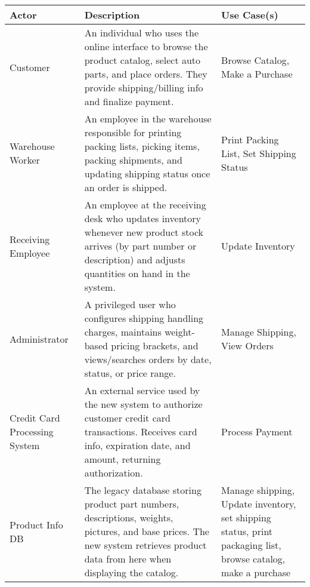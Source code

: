 \documentclass{report}
\begin{document}
    \pagebreak 
    \bigbreak \noindent 
    \begin{center}
        \begin{tabular}{|p{2cm}|p{7cm}|p{5.2cm}|}
            \hline
            Actor	&Description	&Use Case(s) \\
            \hline
            Customer&	An individual who uses the online interface to browse the product catalog, select auto parts, and place orders. They provide shipping/billing info and finalize payment.	&Browse Catalog, Make a Purchase \\
            \hline
            Warehouse Worker	&An employee in the warehouse responsible for printing packing lists, picking items, packing shipments, and updating shipping status once an order is shipped.	&Print Packing List, Set Shipping Status \\
            \hline
            Receiving Employee	&An employee at the receiving desk who updates inventory whenever new product stock arrives (by part number or description) and adjusts quantities on hand in the system.	&Update Inventory \\
            \hline
            Administrator	&A privileged user who configures shipping  handling charges, maintains weight-based pricing brackets, and views/searches orders by date, status, or price range.	&Manage Shipping, View Orders \\
            \hline
            Credit Card Processing System	&An external service used by the new system to authorize customer credit card transactions. Receives card info, expiration date, and amount, returning authorization.	&Process Payment \\
            \hline
            Product Info DB	&The legacy database storing product part numbers, descriptions, weights, pictures, and base prices. The new system retrieves product data from here when displaying the catalog.	&Manage shipping, Update inventory, set shipping status, print packaging list, browse catalog, make a purchase\\
            \hline
        \end{tabular}
    \end{center}

    \pagebreak 
    \bigbreak \noindent 
\end{document}
